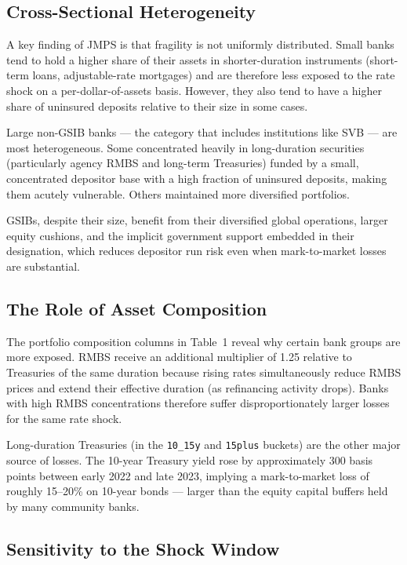 \documentclass[12pt, a4paper]{article}
\begin{document}
\subsection{Cross-Sectional Heterogeneity}

A key finding of JMPS is that fragility is not uniformly distributed. Small banks
tend to hold a higher share of their assets in shorter-duration instruments
(short-term loans, adjustable-rate mortgages) and are therefore less exposed to
the rate shock on a per-dollar-of-assets basis. However, they also tend to have
a higher share of uninsured deposits relative to their size in some cases.

Large non-GSIB banks --- the category that includes institutions like SVB ---
are most heterogeneous. Some concentrated heavily in long-duration securities
(particularly agency RMBS and long-term Treasuries) funded by a small, concentrated
depositor base with a high fraction of uninsured deposits, making them acutely
vulnerable. Others maintained more diversified portfolios.

GSIBs, despite their size, benefit from their diversified global operations,
larger equity cushions, and the implicit government support embedded in their
designation, which reduces depositor run risk even when mark-to-market losses
are substantial.

\subsection{The Role of Asset Composition}

The portfolio composition columns in Table~1 reveal why certain bank groups
are more exposed. RMBS receive an additional multiplier of 1.25
relative to Treasuries of the same duration because rising rates simultaneously
reduce RMBS prices and extend their effective duration (as refinancing activity
drops). Banks with high RMBS concentrations therefore suffer disproportionately
larger losses for the same rate shock.

Long-duration Treasuries (in the \texttt{10\_15y} and \texttt{15plus} buckets)
are the other major source of losses. The 10-year Treasury yield rose by
approximately 300 basis points between early 2022 and late 2023, implying a
mark-to-market loss of roughly 15--20\% on 10-year bonds --- larger than the
equity capital buffers held by many community banks.

\subsection{Sensitivity to the Shock Window}
\end{document}
